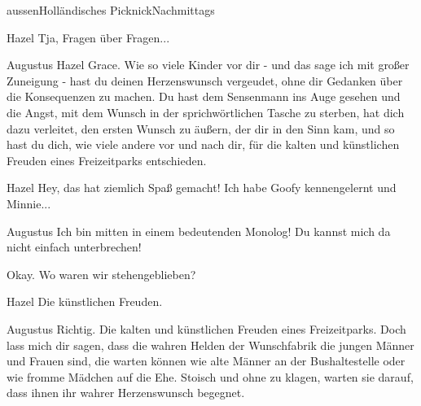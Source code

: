 \documentclass[12pt]{article}
\begin{document}
\begin{scene}{aussen}{Holländisches Picknick}{Nachmittags}
        \begin{dialog}{Hazel}
            Tja, Fragen über Fragen...
        \end{dialog}

        \begin{dialog}{Augustus}
            Hazel Grace.
            Wie so viele Kinder vor dir - und das sage ich mit großer Zuneigung - hast du deinen Herzenswunsch vergeudet, ohne dir Gedanken über die Konsequenzen zu machen.
            Du hast dem Sensenmann ins Auge gesehen und die Angst, mit dem Wunsch in der sprichwörtlichen Tasche zu sterben, hat dich dazu verleitet, den ersten Wunsch zu äußern, der dir in den Sinn kam, und so hast du dich, wie viele andere vor und nach dir, für die kalten und künstlichen Freuden eines Freizeitparks entschieden.
        \end{dialog}

        \begin{dialog}{Hazel}
            Hey, das hat ziemlich Spaß gemacht!
            Ich habe Goofy kennengelernt und Minnie...
        \end{dialog}

        \begin{dialog}{Augustus}
            Ich bin mitten in einem bedeutenden Monolog!
            Du kannst mich da nicht einfach unterbrechen!

            Okay.
            Wo waren wir stehengeblieben?
        \end{dialog}

        \begin{dialog}{Hazel}
            Die künstlichen Freuden.
        \end{dialog}


        \begin{dialog}{Augustus}
            Richtig.
            Die kalten und künstlichen Freuden eines Freizeitparks.
            Doch lass mich dir sagen, dass die wahren Helden der Wunschfabrik die jungen Männer und Frauen sind, die warten können wie alte Männer an der Bushaltestelle oder wie fromme Mädchen auf die Ehe.
            Stoisch und ohne zu klagen, warten sie darauf, dass ihnen ihr wahrer Herzenswunsch begegnet.
        \end{dialog}
    \end{scene}
\end{document}
